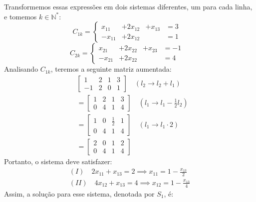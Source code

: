 Transformemos essas expressões em dois sistemas diferentes, um para cada linha, e tomemos $k \in \mathbb{N}^*$:
\begin{displaymath}
    C_{1k} = \left\{\begin{array}{ccccc} 
    x_{11} & + 2x_{12} & + x_{13} & = 3  &\\
    -x_{11} &+ 2x_{12} && = 1 &
    \end{array}\right.
\end{displaymath}
\begin{displaymath}
    C_{2k} = \left\{\begin{array}{ccccc} 
    x_{21} & + 2x_{22} & + x_{23} & = -1  &\\
    -x_{21} &+ 2x_{22} && = 4 &
    \end{array}\right.
\end{displaymath}
Analisando $C_{1k}$, teremos a seguinte matriz aumentada:
\begin{align*}
    &\left[\begin{array}{cccc} 
        1 & 2 & 1 & 3 \\
        -1 & 2 & 0 & 1
    \end{array} \right] \quad (l_2 \rightarrow l_2 + l_1) 
    \\ &= 
    \left[\begin{array}{cccc} 
        1 & 2 & 1 & 3 \\
        0 & 4 & 1 & 4
    \end{array} \right] \quad (l_1 \rightarrow l_1 - \frac{1}{2}l_2)
    \\ &=
    \left[\begin{array}{cccc} 
        1 & 0 & \frac{1}{2} & 1 \\
        0 & 4 & 1 & 4
    \end{array} \right] \quad (l_1 \rightarrow l_1 \cdot 2)
    \\ &=
    \left[\begin{array}{cccc} 
        2 & 0 & 1 & 2 \\
        0 & 4 & 1 & 4
    \end{array} \right] 
\end{align*}
Portanto, o sistema deve satisfazer:
\begin{align*}
    (I) \quad 2x_{11} + x_{13} = 2 \implies x_{11} = 1 - \frac{x_{13}}{2} \\
    (II) \quad 4x_{12} + x_{13} = 4 \implies x_{12} = 1 - \frac{x_{13}}{4}
\end{align*}
Assim, a solução para esse sistema, denotada por $S_1$, é:
